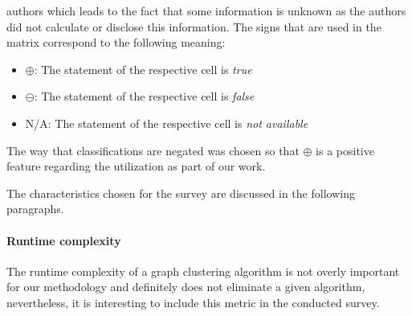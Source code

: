 \documentclass[12pt,a4paper]{report}
\begin{document}
\begin{table}[ht!]
{  authors which leads to the fact that some information is unknown as
  the authors did not calculate or disclose this information.
  The signs that are used in the matrix correspond to the following meaning:
  \begin{itemize}[noitemsep]
    \item $\oplus$: The statement of the respective cell is \textit{true}
    \item $\ominus$: The statement of the respective cell is \textit{false}
    \item N/A: The statement of the respective cell is \textit{not available}
  \end{itemize}
  The way that classifications are negated was chosen so that $\oplus$
  is a positive feature regarding the utilization as part of our work.
}
\label{table:graph-clustering-survey}
\end{table}

The characteristics chosen for the survey are discussed in the following paragraphs.

\paragraph{Runtime complexity}
The runtime complexity of a graph clustering algorithm is not overly
important for our methodology and definitely does not eliminate a given algorithm,
nevertheless, it is interesting to include this metric in the conducted survey.
\end{document}
